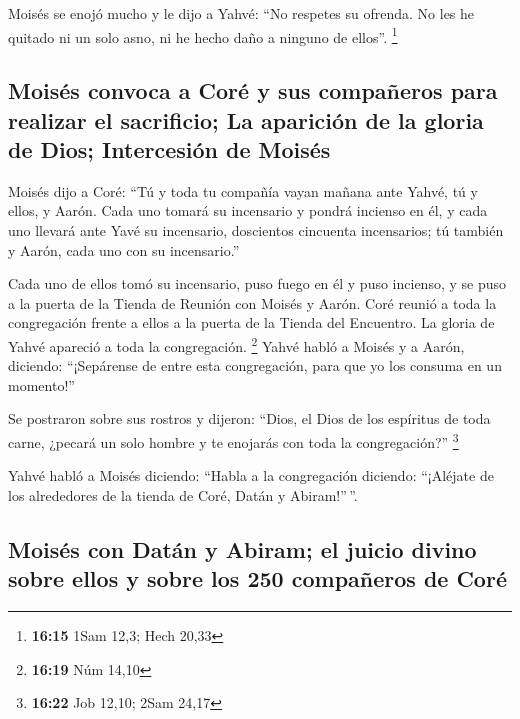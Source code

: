 \begin{paracol}{2}
 Moisés se enojó mucho y le dijo a Yahvé: ``No respetes
su ofrenda. No les he quitado ni un solo asno, ni he hecho daño a
ninguno de ellos''. \footnote{\textbf{16:15} 1Sam 12,3; Hech 20,33}

\hypertarget{moisuxe9s-convoca-a-coruxe9-y-sus-compauxf1eros-para-realizar-el-sacrificio-la-apariciuxf3n-de-la-gloria-de-dios-intercesiuxf3n-de-moisuxe9s}{%
\subsection{Moisés convoca a Coré y sus compañeros para realizar el
sacrificio; La aparición de la gloria de Dios; Intercesión de
Moisés}\label{moisuxe9s-convoca-a-coruxe9-y-sus-compauxf1eros-para-realizar-el-sacrificio-la-apariciuxf3n-de-la-gloria-de-dios-intercesiuxf3n-de-moisuxe9s}}

 Moisés dijo a Coré: ``Tú y toda tu compañía vayan mañana
ante Yahvé, tú y ellos, y Aarón.  Cada uno tomará su
incensario y pondrá incienso en él, y cada uno llevará ante Yavé su
incensario, doscientos cincuenta incensarios; tú también y Aarón, cada
uno con su incensario.''

 Cada uno de ellos tomó su incensario, puso fuego en él y
puso incienso, y se puso a la puerta de la Tienda de Reunión con Moisés
y Aarón.  Coré reunió a toda la congregación frente a
ellos a la puerta de la Tienda del Encuentro. La gloria de Yahvé
apareció a toda la congregación. \footnote{\textbf{16:19} Núm 14,10}
 Yahvé habló a Moisés y a Aarón, diciendo:
 ``¡Sepárense de entre esta congregación, para que yo los
consuma en un momento!''

 Se postraron sobre sus rostros y dijeron: ``Dios, el
Dios de los espíritus de toda carne, ¿pecará un solo hombre y te
enojarás con toda la congregación?'' \footnote{\textbf{16:22} Job 12,10;
  2Sam 24,17}

 Yahvé habló a Moisés diciendo:  ``Habla a
la congregación diciendo: ``¡Aléjate de los alrededores de la tienda de
Coré, Datán y Abiram!''\,''.

\hypertarget{moisuxe9s-con-datuxe1n-y-abiram-el-juicio-divino-sobre-ellos-y-sobre-los-250-compauxf1eros-de-coruxe9}{%
\subsection{Moisés con Datán y Abiram; el juicio divino sobre ellos y
sobre los 250 compañeros de
Coré}\label{moisuxe9s-con-datuxe1n-y-abiram-el-juicio-divino-sobre-ellos-y-sobre-los-250-compauxf1eros-de-coruxe9}}


\end{paracol}
